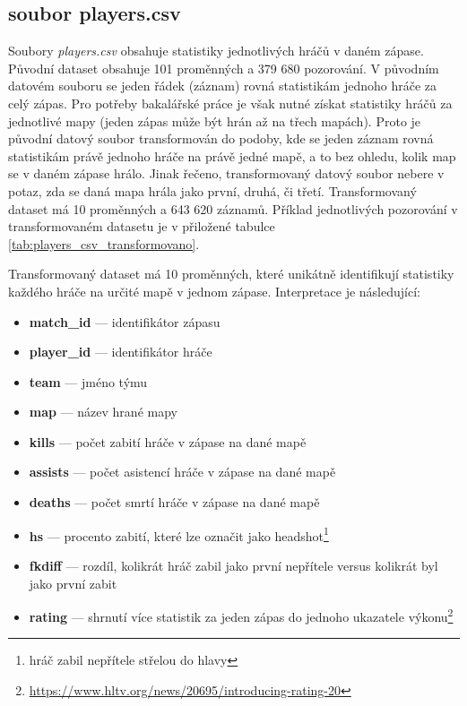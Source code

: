 {\color{red}
\subsection{soubor players.csv}
Soubory \textit{players.csv} obsahuje statistiky jednotlivých hráčů v daném zápase. Původní dataset obsahuje 101 proměnných a 379 680 pozorování.
V původním datovém souboru se jeden řádek (záznam) rovná statistikám jednoho hráče za celý zápas. Pro potřeby bakalářské práce je však nutné získat statistiky hráčů
za jednotlivé mapy (jeden zápas může být hrán až na třech mapách). Proto je původní datový soubor transformován do podoby, kde se jeden záznam rovná statistikám
právě jednoho hráče na právě jedné mapě, a to bez ohledu, kolik map se v daném zápase hrálo. Jinak řečeno, transformovaný datový soubor nebere v potaz, zda
se daná mapa hrála jako první, druhá, či třetí.
Transformovaný dataset má 10 proměnných a 643 620 záznamů. Příklad jednotlivých pozorování v transformovaném
datasetu je v přiložené tabulce \ref{tab:players_csv_transformovano}.
}
\newpage
Transformovaný dataset má 10 proměnných, které unikátně identifikují statistiky každého hráče na určité mapě v jednom zápase. Interpretace je následující:
\begin{itemize}
    \item \textbf{match\_id} --- identifikátor zápasu
    \item \textbf{player\_id} --- identifikátor hráče
    \item \textbf{team} --- jméno týmu
    \item \textbf{map} --- název hrané mapy
    \item \textbf{kills} --- počet zabití hráče v zápase na dané mapě
    \item \textbf{assists} --- počet asistencí hráče v zápase na dané mapě
    \item \textbf{deaths} --- počet smrtí hráče v zápase na dané mapě
    \item \textbf{hs} --- procento zabití, které lze označit jako headshot\footnote{hráč zabil nepřítele střelou do hlavy}
    \item \textbf{fkdiff} --- rozdíl, kolikrát hráč zabil jako první nepřítele versus kolikrát byl jako první zabit
    \item \textbf{rating} --- shrnutí více statistik za jeden zápas do jednoho ukazatele výkonu\footnote{\url{https://www.hltv.org/news/20695/introducing-rating-20}}
\end{itemize}

